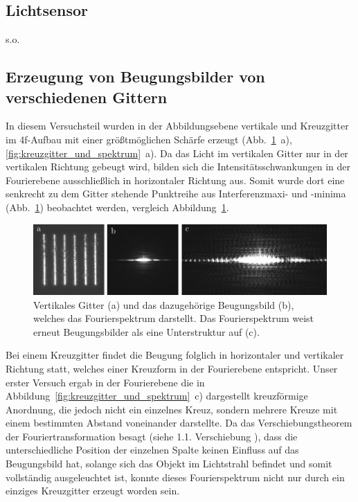 
\subsection{Lichtsensor}
s.o.

\subsection{Erzeugung von Beugungsbilder von verschiedenen Gittern}

In diesem Versuchsteil wurden in der Abbildungsebene vertikale und Kreuzgitter im 4f-Aufbau mit einer größtmöglichen Schärfe erzeugt (Abb.~\ref{fig:gitter_und_spektrum}~a), \ref{fig:kreuzgitter_und_spektrum}~a). %
Da das Licht im vertikalen Gitter nur in der vertikalen Richtung gebeugt wird, bilden sich die Intensitätsschwankungen in der Fourierebene ausschließlich in horizontaler Richtung aus. Somit wurde dort eine senkrecht zu dem Gitter stehende Punktreihe aus Interferenzmaxi- und -minima (Abb.~\ref{fig:gitter_und_spektrum}) beobachtet werden, vergleich Abbildung~\ref{fig:gitter_und_spektrum}.
	
\begin{figure}[ht]
	\centering
	\includegraphics{images/Regina/abb13.pdf}
	\caption[Gitter mit Fourierspektrum]{
		Vertikales Gitter (a) und das dazugehörige Beugungsbild (b), welches das Fourierspektrum darstellt. Das Fourierspektrum weist erneut Beugungsbilder als eine Unterstruktur auf (c).
	}
	\label{fig:gitter_und_spektrum}
\end{figure}


Bei einem Kreuzgitter findet die Beugung folglich in horizontaler und vertikaler Richtung statt, welches einer Kreuzform in der Fourierebene entspricht. Unser erster Versuch ergab in der Fourierebene die in Abbildung~\ref{fig:kreuzgitter_und_spektrum}~c) dargestellt kreuzförmige Anordnung, die jedoch nicht ein einzelnes Kreuz, sondern mehrere Kreuze mit einem bestimmten Abstand voneinander darstellte. Da das Verschiebungstheorem der Fouriertransformation besagt (siehe 1.1. Verschiebung%
), dass die unterschiedliche Position der einzelnen Spalte keinen Einfluss auf das Beugungsbild hat, solange sich das Objekt im Lichtstrahl befindet und somit vollständig ausgeleuchtet ist, konnte dieses Fourierspektrum nicht nur durch ein einziges Kreuzgitter erzeugt worden sein. 

